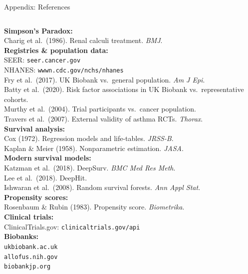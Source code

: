 \documentclass[aspectratio=169,10pt]{beamer}
\begin{document}
\begin{frame}{Appendix: References}
\tiny
\begin{columns}[T]
\textbf{Simpson's Paradox:}\\
Charig et al.\ (1986). Renal calculi treatment. \textit{BMJ}.\\[0.1em]

\textbf{Registries \& population data:}\\
SEER: \texttt{seer.cancer.gov}\\
NHANES: \texttt{wwwn.cdc.gov/nchs/nhanes}\\
Fry et al.\ (2017). UK Biobank vs.\ general population. \textit{Am J Epi}.\\
Batty et al.\ (2020). Risk factor associations in UK Biobank vs.\ representative cohorts.\\
Murthy et al.\ (2004). Trial participants vs.\ cancer population.\\
Travers et al.\ (2007). External validity of asthma RCTs. \textit{Thorax}.\\[0.1em]

\textbf{Survival analysis:}\\
Cox (1972). Regression models and life-tables. \textit{JRSS-B}.\\
Kaplan \& Meier (1958). Nonparametric estimation. \textit{JASA}.\\

\textbf{Modern survival models:}\\
Katzman et al.\ (2018). DeepSurv. \textit{BMC Med Res Meth}.\\
Lee et al.\ (2018). DeepHit.\\
Ishwaran et al.\ (2008). Random survival forests. \textit{Ann Appl Stat}.\\[0.1em]

\textbf{Propensity scores:}\\
Rosenbaum \& Rubin (1983). Propensity score. \textit{Biometrika}.\\[0.1em]

\textbf{Clinical trials:}\\
ClinicalTrials.gov: \texttt{clinicaltrials.gov/api}\\[0.1em]

\textbf{Biobanks:}\\
\texttt{ukbiobank.ac.uk}\\
\texttt{allofus.nih.gov}\\
\texttt{biobankjp.org}
\end{columns}
\end{frame}
\end{document}
